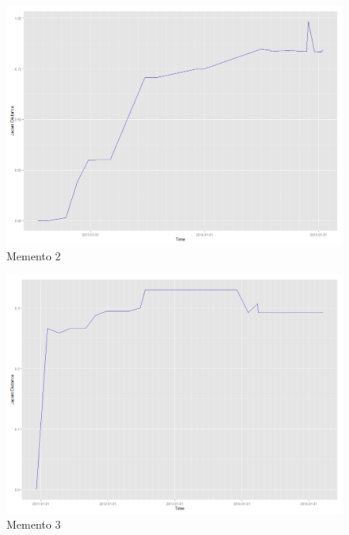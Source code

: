 \begin{enumerate}
\newpage
\begin{figure}[ht]    
    \begin{center}
        \includegraphics[scale=0.40]{graphs/3_j5.png}
        \caption{Memento 2}
    \end{center}
\end{figure}

\newpage
\begin{figure}[ht]    
    \begin{center}
        \includegraphics[scale=0.40]{graphs/3_j6.png}
        \caption{Memento 3}
    \end{center}
\end{figure}


\end{enumerate}
